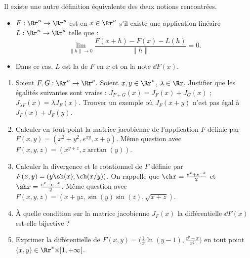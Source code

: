 \documentclass[11pt, class=report,crop=false]{standalone}
\begin{document}
\begin{remarque*}  
Il existe une autre définition équivalente des deux notions rencontrées.

\begin{itemize}

  \item $F : \Rr^n \to \Rr^p$ est  en $x \in \Rr^n$ s'il existe une application linéaire $L : \Rr^n \to \Rr^p$ telle que :
$$
\lim_{\|h\| \to 0}  \frac{F(x + h) - F(x) - L (h)}{\|h\|} = 0 .$$

 \item Dans ce cas, $L$ est la  de $F$ en $x$ et on la note $\dd F(x)$.
\end{itemize}
\end{remarque*}


 
\begin{miniexercices}
\sauteligne
\begin{enumerate}
  \item Soient $F,G : \Rr^n \to \Rr^p$. Soient $x,y \in \Rr^n$, $\lambda \in \Rr$. Justifier que les égalités suivantes sont vraies :
  $J_{F+G} (x) = J_F(x) + J_G (x)$ ; 
  $J_{\lambda F} (x)= \lambda J_F (x)$.
  Trouver un exemple où $J_{F} (x+y)$ n'est pas égal à $J_F(x) + J_F (y)$.
  
  \item Calculer en tout point la matrice jacobienne de l'application $F$ définie par $F(x,y) = (x^2+y^2,e^{xy},x+y)$.
 Même question avec $F(x,y,z) = ( x^{y+z}, z\arctan(y) )$.
 
   \item Calculer la divergence et le rotationnel de $F$ définie par $F(x,y) = ( y\sh(x) , \ch(x/y))$.   
   On rappelle que $\ch x = \frac{e^x+e^{-x}}{2}$ et $\sh x = \frac{e^x-e^{-x}}{2}$. Même question avec 
   $F(x,y,z) = ( x+yz, \sin(y)\sin(z), \sqrt{x+z} )$.
    
   \item À quelle condition sur la matrice jacobienne $J_F(x)$ la différentielle $\dd F (x)$ est-elle bijective ?
  
   \item Exprimer la différentielle de 
  $F(x,y) = \big( \frac{1}{x}\ln(y-1) , \frac{e^y-x}{x^2} \big)$ 
  en tout point $(x,y) \in \Rr^* \times ]1,+\infty[$.
\end{enumerate}
\end{miniexercices}
\end{document}
